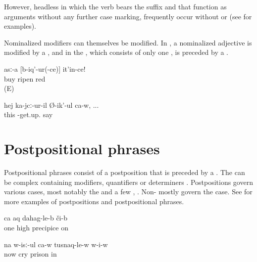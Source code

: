 However, headless  in which the verb bears the  suffix  and that function as  arguments without any further case marking, frequently occur without  or  (see  for examples).

Nominalized modifiers can themselves be modified. In , a nominalized adjective is modified by a , and in  the , which consists of only one , is preceded by a .


\begin{exe}
	\ex	\label{ex:Buy a ripe red one minor2}
	\gll	asː-a	[b-iq'-ur(-ce)]	it'in-ce!\\
		buy	ripen	red\\
	\glt	{} (E)
	
		\ex	\label{ex:The one who is standing says2}
	\gll	hej	ka-jcː-ur-il	Ø-ik'-ul	ca-w, ...\\
		this	-get.up.	say	 \\
	\glt	{}
	
	
\end{exe}




\section{Postpositional phrases}
\label{sec:Postpositional phrases}

Postpositional phrases consist of a postposition that is preceded by a . The  can be complex containing modifiers, quantifiers or determiners . Postpositions govern various cases, most notably the  and a few  , . Non- mostly govern the  case. See  for more examples of postpositions and postpositional phrases.
%
\begin{exe}
	\ex	\label{ex:on one high precipice}
	\gll	ca	aq	dahag-le-b či-b\\
		one	high	precipice on\\
	\glt	{}

	\ex	\label{ex:‎Now he is crying in prison}
	\gll	na	w-isː-ul	ca-w	tusnaq-le-w	w-i-w\\
		now	cry		prison	in\\
	\glt	{}
\end{exe}

